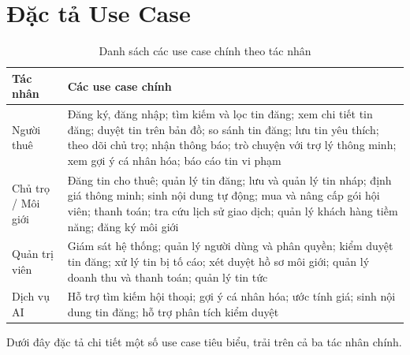 \section{Đặc tả Use Case}

\begin{table}[!ht]
\centering
\caption{Danh sách các use case chính theo tác nhân}
\label{tab:usecase-list}
\begin{tabular}{p{} p{}}
\hline
\textbf{Tác nhân} & \textbf{Các use case chính} \\
\hline
Người thuê & Đăng ký, đăng nhập; tìm kiếm và lọc tin đăng; xem chi tiết tin đăng; duyệt tin trên bản đồ; so sánh tin đăng; lưu tin yêu thích; theo dõi chủ trọ; nhận thông báo; trò chuyện với trợ lý thông minh; xem gợi ý cá nhân hóa; báo cáo tin vi phạm \\
\hline
Chủ trọ / Môi giới & Đăng tin cho thuê; quản lý tin đăng; lưu và quản lý tin nháp; định giá thông minh; sinh nội dung tự động; mua và nâng cấp gói hội viên; thanh toán; tra cứu lịch sử giao dịch; quản lý khách hàng tiềm năng; đăng ký môi giới \\
\hline
Quản trị viên & Giám sát hệ thống; quản lý người dùng và phân quyền; kiểm duyệt tin đăng; xử lý tin bị tố cáo; xét duyệt hồ sơ môi giới; quản lý doanh thu và thanh toán; quản lý tin tức \\
\hline
Dịch vụ AI & Hỗ trợ tìm kiếm hội thoại; gợi ý cá nhân hóa; ước tính giá; sinh nội dung tin đăng; hỗ trợ phân tích kiểm duyệt \\
\hline
\end{tabular}
\end{table}

Dưới đây đặc tả chi tiết một số use case tiêu biểu, trải trên cả ba tác nhân chính.

